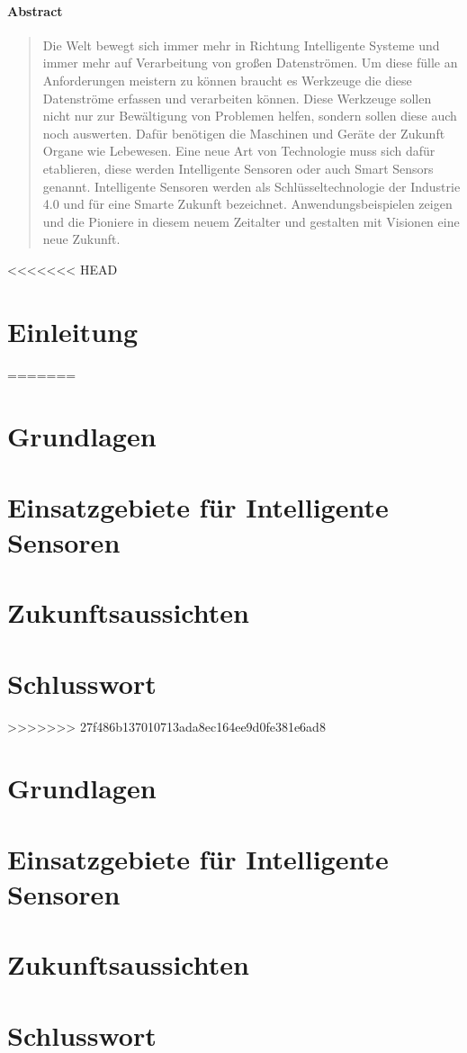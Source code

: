 \documentclass[a4paper,12pt]{scrartcl}
\begin{document}
\paragraph{\large Abstract}
\begin{abstract}
Die Welt bewegt sich immer mehr in Richtung Intelligente Systeme und immer mehr auf Verarbeitung von großen Datenströmen. Um diese fülle an Anforderungen meistern zu können braucht es Werkzeuge die diese Datenströme erfassen und verarbeiten können. Diese Werkzeuge sollen nicht nur zur Bewältigung von Problemen helfen, sondern sollen diese auch noch auswerten. Dafür benötigen die Maschinen und Geräte der Zukunft Organe wie Lebewesen. Eine neue Art von Technologie muss sich dafür etablieren, diese werden Intelligente Sensoren oder auch Smart Sensors genannt.
Intelligente Sensoren werden als Schlüsseltechnologie der Industrie 4.0 und für eine Smarte Zukunft bezeichnet. Anwendungsbeispielen zeigen und die Pioniere in diesem neuem Zeitalter und gestalten mit Visionen eine neue Zukunft.
\end{abstract}

<<<<<<< HEAD
\section{Einleitung}
=======
\section{Grundlagen}

\section{Einsatzgebiete für Intelligente Sensoren}

\section{Zukunftsaussichten}

\section{Schlusswort}
>>>>>>> 27f486b137010713ada8ec164ee9d0fe381e6ad8

\section{Grundlagen}


\section{Einsatzgebiete für Intelligente Sensoren}

\section{Zukunftsaussichten}

\section{Schlusswort}

\setcounter{page}{1}

\newpage



\clearpage

\end{document}
